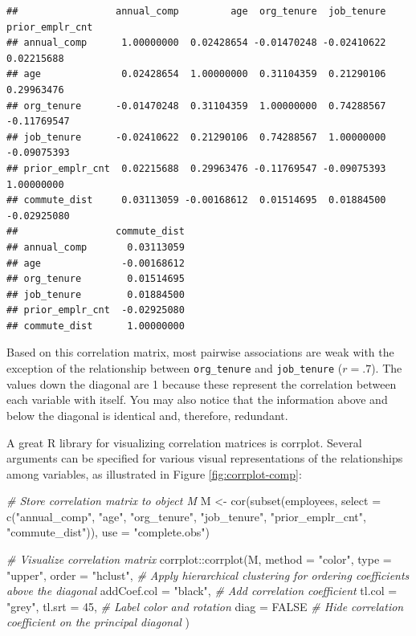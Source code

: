 \documentclass[
]{book}
\newenvironment{Shaded}{\begin{snugshade}}{\end{snugshade}}
\newcommand{\AttributeTok}[1]{\textcolor[rgb]{0.77,0.63,0.00}{#1}}
\newcommand{\CommentTok}[1]{\textcolor[rgb]{0.56,0.35,0.01}{\textit{#1}}}
\newcommand{\ConstantTok}[1]{\textcolor[rgb]{0.00,0.00,0.00}{#1}}
\newcommand{\DecValTok}[1]{\textcolor[rgb]{0.00,0.00,0.81}{#1}}
\newcommand{\FunctionTok}[1]{\textcolor[rgb]{0.00,0.00,0.00}{#1}}
\newcommand{\NormalTok}[1]{#1}
\newcommand{\OtherTok}[1]{\textcolor[rgb]{0.56,0.35,0.01}{#1}}
\newcommand{\SpecialCharTok}[1]{\textcolor[rgb]{0.00,0.00,0.00}{#1}}
\newcommand{\StringTok}[1]{\textcolor[rgb]{0.31,0.60,0.02}{#1}}
\begin{document}
\begin{verbatim}
##                 annual_comp         age  org_tenure  job_tenure prior_emplr_cnt
## annual_comp      1.00000000  0.02428654 -0.01470248 -0.02410622      0.02215688
## age              0.02428654  1.00000000  0.31104359  0.21290106      0.29963476
## org_tenure      -0.01470248  0.31104359  1.00000000  0.74288567     -0.11769547
## job_tenure      -0.02410622  0.21290106  0.74288567  1.00000000     -0.09075393
## prior_emplr_cnt  0.02215688  0.29963476 -0.11769547 -0.09075393      1.00000000
## commute_dist     0.03113059 -0.00168612  0.01514695  0.01884500     -0.02925080
##                 commute_dist
## annual_comp       0.03113059
## age              -0.00168612
## org_tenure        0.01514695
## job_tenure        0.01884500
## prior_emplr_cnt  -0.02925080
## commute_dist      1.00000000
\end{verbatim}

Based on this correlation matrix, most pairwise associations are weak with the exception of the relationship between \texttt{org\_tenure} and \texttt{job\_tenure} (\(r = .7\)). The values down the diagonal are 1 because these represent the correlation between each variable with itself. You may also notice that the information above and below the diagonal is identical and, therefore, redundant.

A great R library for visualizing correlation matrices is corrplot. Several arguments can be specified for various visual representations of the relationships among variables, as illustrated in Figure \ref{fig:corrplot-comp}:

\begin{Shaded}
\begin{Highlighting}[]
\CommentTok{\# Store correlation matrix to object M}
\NormalTok{M }\OtherTok{\textless{}{-}} \FunctionTok{cor}\NormalTok{(}\FunctionTok{subset}\NormalTok{(employees, }\AttributeTok{select =} \FunctionTok{c}\NormalTok{(}\StringTok{"annual\_comp"}\NormalTok{, }\StringTok{"age"}\NormalTok{, }\StringTok{"org\_tenure"}\NormalTok{, }\StringTok{"job\_tenure"}\NormalTok{, }\StringTok{"prior\_emplr\_cnt"}\NormalTok{, }\StringTok{"commute\_dist"}\NormalTok{)), }\AttributeTok{use =} \StringTok{"complete.obs"}\NormalTok{)}

\CommentTok{\# Visualize correlation matrix}
\NormalTok{corrplot}\SpecialCharTok{::}\FunctionTok{corrplot}\NormalTok{(M, }\AttributeTok{method =} \StringTok{"color"}\NormalTok{,  }
                   \AttributeTok{type =} \StringTok{"upper"}\NormalTok{, }\AttributeTok{order =} \StringTok{"hclust"}\NormalTok{, }\CommentTok{\# Apply hierarchical clustering for ordering coefficients above the diagonal}
                   \AttributeTok{addCoef.col =} \StringTok{"black"}\NormalTok{, }\CommentTok{\# Add correlation coefficient}
                   \AttributeTok{tl.col =} \StringTok{"grey"}\NormalTok{, }\AttributeTok{tl.srt =} \DecValTok{45}\NormalTok{, }\CommentTok{\# Label color and rotation}
                   \AttributeTok{diag =} \ConstantTok{FALSE} \CommentTok{\# Hide correlation coefficient on the principal diagonal}
\NormalTok{                   )}
\end{Highlighting}
\end{Shaded}
\end{document}
